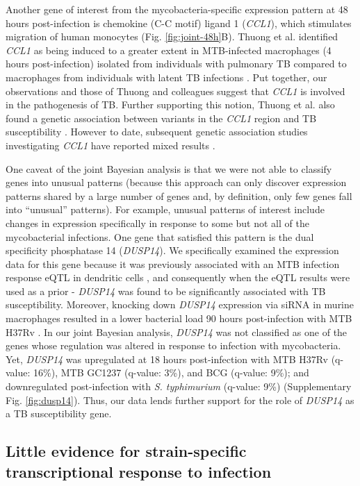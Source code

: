 Another gene of interest from the mycobacteria-specific expression
pattern at 48 hours post-infection is chemokine (C-C motif) ligand 1
(\emph{CCL1}), which stimulates migration of human monocytes
\citep{Miller1992} (Fig. \ref{fig:joint-48h}B). Thuong et
al. identified \emph{CCL1} as being induced to a greater extent in
MTB-infected macrophages (4 hours post-infection) isolated from
individuals with pulmonary TB compared to macrophages from individuals
with latent TB infections \citep{Thuong2008}. Put together, our
observations and those of Thuong and colleagues suggest that
\emph{CCL1} is involved in the pathogenesis of TB. Further supporting
this notion, Thuong et al. also found a genetic association between
variants in the \emph{CCL1} region and TB susceptibility
\citep{Thuong2008}. However to date, subsequent genetic association
studies investigating \emph{CCL1} have reported mixed results
\citep{Tang2011, Ozdemir2013}.

One caveat of the joint Bayesian analysis is that we were not able to
classify genes into unusual patterns (because this approach can only
discover expression patterns shared by a large number of genes and, by
definition, only few genes fall into ``unusual'' patterns). For
example, unusual patterns of interest include changes in expression
specifically in response to some but not all of the mycobacterial
infections. One gene that satisfied this pattern is the dual
specificity phosphatase 14 (\emph{DUSP14}). We specifically examined
the expression data for this gene because it was previously associated
with an MTB infection response eQTL in dendritic cells
\citep{Barreiro2012}, and consequently when the eQTL results were used
as a prior - \emph{DUSP14} was found to be significantly associated
with TB susceptibility. Moreover, knocking down \emph{DUSP14}
expression via siRNA in murine macrophages resulted in a lower
bacterial load 90 hours post-infection with MTB H37Rv
\citep{Jayaswal2010}. In our joint Bayesian analysis, \emph{DUSP14}
was not classified as one of the genes whose regulation was altered in
response to infection with mycobacteria. Yet, \emph{DUSP14} was
upregulated at 18 hours post-infection with MTB H37Rv (q-value: 16\%),
MTB GC1237 (q-value: 3\%), and BCG (q-value: 9\%); and downregulated
post-infection with \emph{S. typhimurium} (q-value: 9\%)
(Supplementary Fig. \ref{fig:dusp14}). Thus, our data lends further
support for the role of \emph{DUSP14} as a TB susceptibility gene.

\subsection{Little evidence for strain-specific transcriptional
response to
infection}\label{little-evidence-for-strain-specific-transcriptional-response-to-infection}

